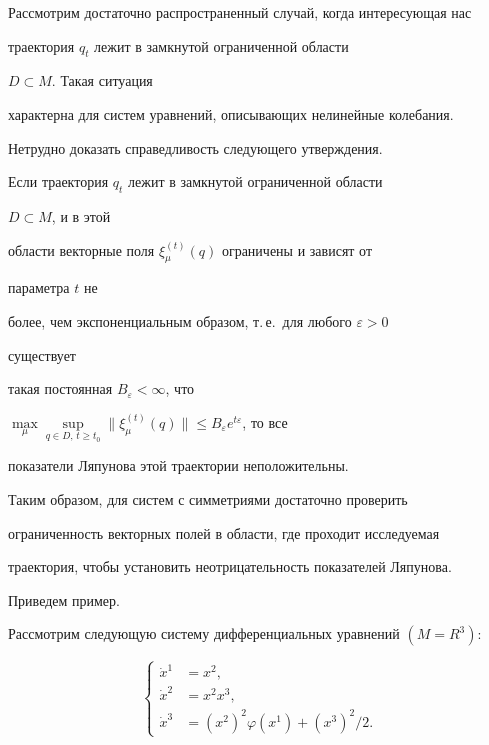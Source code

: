 


Рассмотрим достаточно распространенный случай, когда интересующая нас 


траектория $q_t$ лежит в замкнутой ограниченной области 


$D\subset M$. Такая ситуация 


характерна для систем уравнений, описывающих нелинейные колебания. 


Нетрудно доказать справедливость следующего утверждения. 


 


\begin{cor} 


Если траектория $q_t$ лежит в замкнутой ограниченной области 


$D\subset M$, и в этой 


области векторные поля $\xi^{(t)}_\mu(q)$ ограничены и зависят от 


параметра $t$ не 


более, чем экспоненциальным образом, т.\,е.~для любого $\varepsilon>0$ 


существует 


такая постоянная $B_\varepsilon<\infty$, что 


$\max\limits_\mu\sup\limits_{q\in D,\,t\ge t_0} 


\|\xi^{(t)}_\mu(q)\|\le B_\varepsilon e^{t\varepsilon}$, то все 


показатели Ляпунова этой траектории неположительны. 


\end{cor} 


 


Таким образом, для систем с симметриями достаточно проверить 


ограниченность векторных полей в области, где проходит исследуемая 


траектория, чтобы установить неотрицательность показателей Ляпунова. 





Приведем пример. 


Рассмотрим следующую систему дифференциальных уравнений $(M=R^3)$: 


\begin{equation} 


\left\{ 


\begin{split} 


\Dot x^1&=x^2,\\ 


\Dot x^2&=x^2x^3,\\ 


\Dot x^3&=(x^2)^2\varphi(x^1)+(x^3)^2/2. 


\end{split} 


\right. 


\end{equation} 


